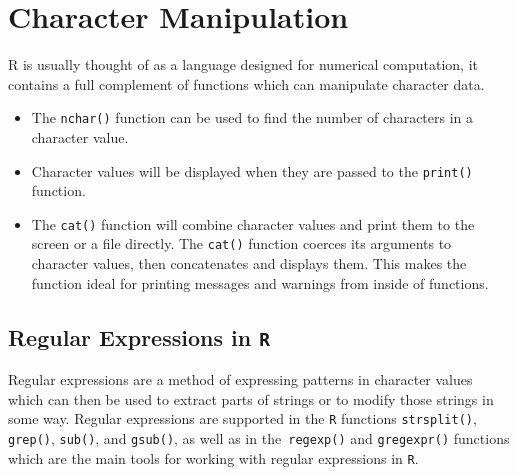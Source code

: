 
\section{Character Manipulation}
R is usually thought of as a language designed for numerical computation,
it contains a full complement of functions which can manipulate character
data.

\begin{itemize}
\item The \texttt{nchar()} function can be used to find the number of characters in a character value.
\item Character values will be displayed when they are passed to the  \texttt{print()} function.
\item The \texttt{cat()}  function will combine
character values and print them to the screen or a file directly. The \texttt{cat()}
function coerces its arguments to character values, then concatenates and displays
them. This makes the function ideal for printing messages and warnings
from inside of functions.
\end{itemize}

\subsection{Regular Expressions in \texttt{R}}
Regular expressions are a method of expressing patterns in character values
which can then be used to extract parts of strings or to modify those strings in some way. Regular expressions are supported in the \texttt{R} functions \texttt{strsplit()},
\texttt{grep()}, \texttt{sub()}, and \texttt{gsub()}, as well as in the\texttt{ regexp()} and \texttt{gregexpr()} functions which
are the main tools for working with regular expressions in \texttt{R}.


\newpage
